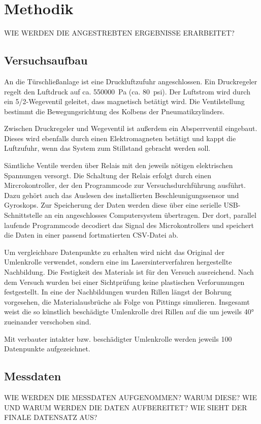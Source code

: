 \chapter{Methodik}
\label{ch:methodik}

WIE WERDEN DIE ANGESTREBTEN ERGEBNISSE ERARBEITET?

\section{Versuchsaufbau}
\label{sec:versuchsaufbau}
An die Türschließanlage ist eine Druckluftzufuhr angeschlossen. Ein Druckregeler regelt den Luftdruck auf ca. \SI{550000}{\pascal} (ca. \SI{80}{psi}). Der Luftstrom wird durch ein 5/2-Wegeventil geleitet, dass magnetisch betätigt wird. Die Ventilstellung bestimmt die Bewegungsrichtung des Kolbens der Pneumatikzylinders. 

Zwischen Druckregeler und Wegeventil ist außerdem ein Absperrventil eingebaut. Dieses wird ebenfalls durch einen Elektromagneten betätigt und kappt die Luftzufuhr, wenn das System zum Stillstand gebracht werden soll.

Sämtliche Ventile werden über Relais mit den jeweils nötigen elektrischen Spannungen versorgt. Die Schaltung der Relais erfolgt durch einen Mircrokontroller, der den Programmcode zur Versuchsdurchführung ausführt. Dazu gehört auch das Auslesen des installierten Beschleunigungssensor und Gyroskops. Zur Speicherung der Daten werden diese über eine serielle USB-Schnittstelle an ein angeschlosses Computersystem übertragen. Der dort, parallel laufende Programmcode decodiert das Signal des Microkontrollers und speichert die Daten in einer passend fortmatierten CSV-Datei ab.

Um vergleichbare Datenpunkte zu erhalten wird nicht das Original der Umlenkrolle verwendet, sondern eine im Lasersinterverfahren hergestellte Nachbildung. Die Festigkeit des Materials ist für den Versuch ausreichend. Nach dem Versuch wurden bei einer Sichtprüfung keine plastischen Verforumungen festgestellt. In eine der Nachbildungen wurden Rillen längst der Bohrung vorgesehen, die Materialausbrüche als Folge von Pittings simulieren. Insgesamt weist die so künstlich beschädigte Umlenkrolle drei Rillen auf die um jeweils 40°  zueinander verschoben sind.

Mit verbauter intakter bzw. beschädigter Umlenkrolle werden jeweils 100 Datenpunkte aufgezeichnet.

\section{Messdaten}
\label{sec:messdaten}
WIE WERDEN DIE MESSDATEN AUFGENOMMEN? WARUM DIESE? WIE UND WARUM WERDEN DIE DATEN AUFBEREITET? WIE SIEHT DER FINALE DATENSATZ AUS?

